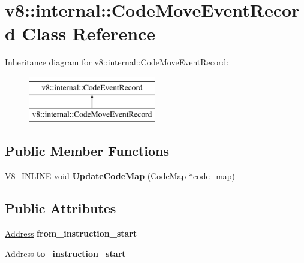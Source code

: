 \hypertarget{classv8_1_1internal_1_1CodeMoveEventRecord}{}\section{v8\+:\+:internal\+:\+:Code\+Move\+Event\+Record Class Reference}
\label{classv8_1_1internal_1_1CodeMoveEventRecord}
Inheritance diagram for v8\+:\+:internal\+:\+:Code\+Move\+Event\+Record\+:\begin{figure}[H]
\begin{center}
\leavevmode
\includegraphics[height=2.000000cm]{classv8_1_1internal_1_1CodeMoveEventRecord}
\end{center}
\end{figure}
\subsection*{Public Member Functions}
\begin{DoxyCompactItemize}
\item 
\mbox{\label{classv8_1_1internal_1_1CodeMoveEventRecord_a7c8bb8c3fb3a8719c0cab87339221aba}} 
V8\+\_\+\+I\+N\+L\+I\+NE void {\bfseries Update\+Code\+Map} (\mbox{\hyperlink{classv8_1_1internal_1_1CodeMap}{Code\+Map}} $\ast$code\+\_\+map)
\end{DoxyCompactItemize}
\subsection*{Public Attributes}
\begin{DoxyCompactItemize}
\item 
\mbox{\label{classv8_1_1internal_1_1CodeMoveEventRecord_ab79e7668d782b7a20e23861f29060485}} 
\mbox{\hyperlink{classuintptr__t}{Address}} {\bfseries from\+\_\+instruction\+\_\+start}
\item 
\mbox{\label{classv8_1_1internal_1_1CodeMoveEventRecord_a110a0ed9a71980b3b89392d492a459bc}} 
\mbox{\hyperlink{classuintptr__t}{Address}} {\bfseries to\+\_\+instruction\+\_\+start}
\end{DoxyCompactItemize}

